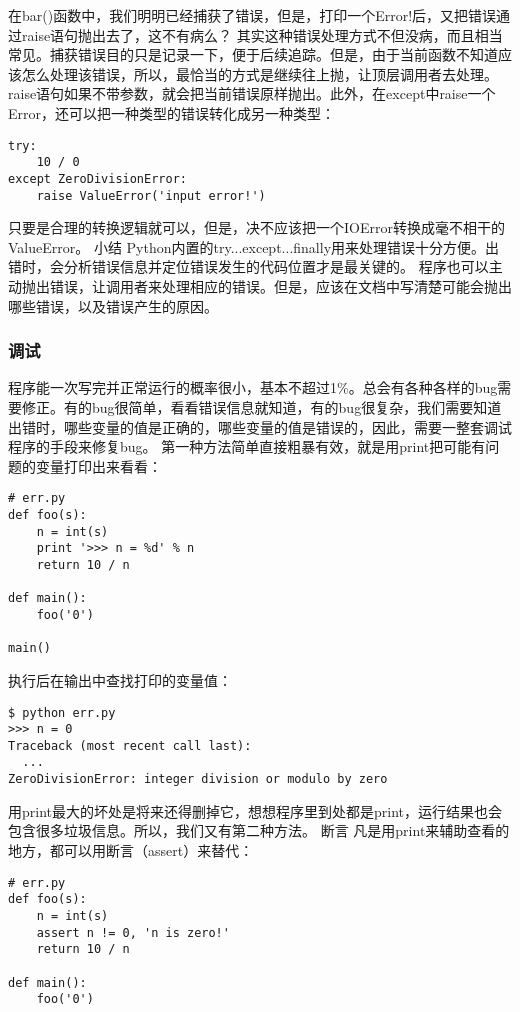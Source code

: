 \documentclass[twoside,11pt]{book}
\begin{document}
在bar()函数中，我们明明已经捕获了错误，但是，打印一个Error!后，又把错误通过raise语句抛出去了，这不有病么？
其实这种错误处理方式不但没病，而且相当常见。捕获错误目的只是记录一下，便于后续追踪。但是，由于当前函数不知道应该怎么处理该错误，所以，最恰当的方式是继续往上抛，让顶层调用者去处理。
raise语句如果不带参数，就会把当前错误原样抛出。此外，在except中raise一个Error，还可以把一种类型的错误转化成另一种类型：
\begin{lstlisting}
try:
    10 / 0
except ZeroDivisionError:
    raise ValueError('input error!')
\end{lstlisting}

只要是合理的转换逻辑就可以，但是，决不应该把一个IOError转换成毫不相干的ValueError。
小结
Python内置的try...except...finally用来处理错误十分方便。出错时，会分析错误信息并定位错误发生的代码位置才是最关键的。
程序也可以主动抛出错误，让调用者来处理相应的错误。但是，应该在文档中写清楚可能会抛出哪些错误，以及错误产生的原因。

\subsubsection{调试}
程序能一次写完并正常运行的概率很小，基本不超过1\%。总会有各种各样的bug需要修正。有的bug很简单，看看错误信息就知道，有的bug很复杂，我们需要知道出错时，哪些变量的值是正确的，哪些变量的值是错误的，因此，需要一整套调试程序的手段来修复bug。
第一种方法简单直接粗暴有效，就是用print把可能有问题的变量打印出来看看：
\begin{lstlisting}
# err.py
def foo(s):
    n = int(s)
    print '>>> n = %d' % n
    return 10 / n

def main():
    foo('0')

main()
\end{lstlisting}

执行后在输出中查找打印的变量值：
\begin{lstlisting}
$ python err.py
>>> n = 0
Traceback (most recent call last):
  ...
ZeroDivisionError: integer division or modulo by zero
\end{lstlisting}

用print最大的坏处是将来还得删掉它，想想程序里到处都是print，运行结果也会包含很多垃圾信息。所以，我们又有第二种方法。
断言
凡是用print来辅助查看的地方，都可以用断言（assert）来替代：
\begin{lstlisting}
# err.py
def foo(s):
    n = int(s)
    assert n != 0, 'n is zero!'
    return 10 / n

def main():
    foo('0')
\end{lstlisting}
\end{document}
